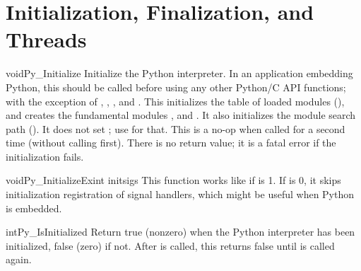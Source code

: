 \chapter{Initialization, Finalization, and Threads
         \label{initialization}}

\begin{cfuncdesc}{void}{Py_Initialize}{}
  Initialize the Python interpreter.  In an application embedding 
  Python, this should be called before using any other Python/C API
  functions; with the exception of
  ,
  ,
  ,
  and .
  This initializes the table of loaded modules (),
  and
  creates the fundamental modules
  ,
   and
  .  It also initializes the module
  search path ().
  It does not set ; use
   for that.  This
  is a no-op when called for a second time (without calling
   first).  There is
  no return value; it is a fatal error if the initialization fails.
\end{cfuncdesc}

\begin{cfuncdesc}{void}{Py_InitializeEx}{int initsigs}
  This function works like  if
   is 1. If  is 0, it skips
  initialization registration of signal handlers, which
  might be useful when Python is embedded. 
\end{cfuncdesc}

\begin{cfuncdesc}{int}{Py_IsInitialized}{}
  Return true (nonzero) when the Python interpreter has been
  initialized, false (zero) if not.  After 
  is called, this returns false until  is
  called again.
\end{cfuncdesc}

